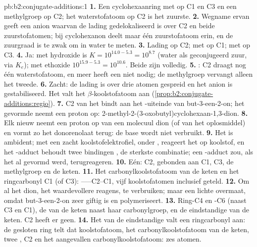 \begin{solution}{pb:b2:conjugate-additions:1}
\textbf{1.} Een cyclohexaanring met  op C1 en C3 en een methylgroep op C2; het waterstofatoom op C2
is het zuurste.
\textbf{2.} Wegname ervan geeft een anion waarvan de lading gedelokaliseerd is over C2 en beide zuurstofatomen; bij
cyclohexanon deelt maar één zuurstofatoom erin, en de zuurgraad is te zwak om in water te meten.
\textbf{3.} Lading op C2;  met  op C1;  met  op C3.
\textbf{4.} Ja: met hydroxide is $K = 10^{14.0 - 5.3} = 10^{8.7}$ (water als geconjugeerd zuur, via
$K_e$); met ethoxide $10^{15.9-5.3} = 10^{10.6}$. Beide zijn volledig.
\textbf{5.} : C2 draagt nog één waterstofatoom, en meer heeft een  niet nodig; de methylgroep
vervangt alleen het tweede.
\textbf{6.} Zacht: de lading is over drie atomen gespreid en het anion is gestabiliseerd. Het valt het
$\beta$-koolstofatoom aan (\cref{prop:b2:conjugate-additions:regio}).
\textbf{7.} C2 van het  bindt aan het -uiteinde van but-3-een-2-on; het gevormde  neemt een
proton op: 2-methyl-2-(3-oxobutyl)cyclohexaan-1,3-dion.
\textbf{8.} Elk nieuw  neemt een proton op van een molecuul dion (of van het oplosmiddel) en vormt zo
het donorenolaat terug: de base wordt niet verbruikt.
\textbf{9.} Het  is ambident; met een zacht koolstofelektrofiel, onder , reageert het
op koolstof, en het -adduct behoudt twee bindingen , de sterkste combinatie; een
-adduct zou, als het al gevormd werd, terugreageren.
\textbf{10.} Eén: C2, gebonden aan C1, C3, de methylgroep en de keten.
\textbf{11.} Het carbonylkoolstofatoom van de keten en het ringcarbonyl C1 (of C3): ------C2--C1,
vijf koolstofatomen inclusief geteld.
\textbf{12.} Om al het dion, het waardevollere reagens, te verbruiken; maar een lichte overmaat, omdat but-3-een-2-on
zeer giftig is en polymeriseert.
\textbf{13.} Ring-C4 en -C6 (naast C3 en C1), de  van de keten naast haar carbonylgroep, en de eindstandige
 van de keten. C2 heeft er geen.
\textbf{14.} Het  van de eindstandige  valt een ringcarbonyl aan: de gesloten ring telt dat
koolstofatoom, het carbonylkoolstofatoom van de keten, twee , C2 en het aangevallen carbonylkoolstofatoom: zes atomen.

\end{solution}
